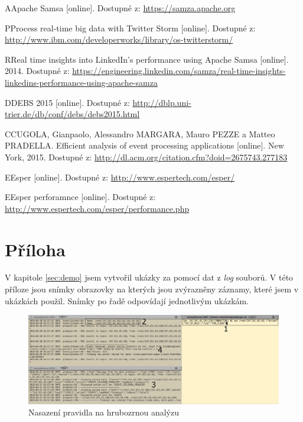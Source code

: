 \documentclass[
  digital, %
  table,   %
  nolof,     %
  nolot,     %
  oneside, %
  nocover,
  monochrome,
  12pt
]{fithesis3}
\begin{document}
\begin{thebibliography}{99}
\bibitem
AApache Samsa [online]. Dostupné z: \url{https://samza.apache.org} \label{bib_samsa}

\bibitem
PProcess real-time big data with Twitter Storm [online]. Dostupné z: \url{http://www.ibm.com/developerworks/library/os-twitterstorm/} \label{bib_distributed_computing}

\bibitem
RReal time insights into LinkedIn's performance using Apache Samsa [online]. 2014. Dostupné z: \url{https://engineering.linkedin.com/samza/real-time-insights-linkedins-performance-using-apache-samza} \label{bib_samsa_case_study}

\bibitem
DDEBS 2015 [online]. Dostupné z: \url{http://dblp.uni-trier.de/db/conf/debs/debs2015.html} \label{bib_debs_conf}

\bibitem
CCUGOLA, Gianpaolo, Alessandro MARGARA, Mauro PEZZE a Matteo PRADELLA. Efficient analysis of event processing applications [online]. New York, 2015. Dostupné z: \url{http://dl.acm.org/citation.cfm?doid=2675743.277183} \label{bib_cave}

\bibitem
EEsper [online]. Dostupné z: \url{http://www.espertech.com/esper/} \label{bib_esper}

\bibitem
EEsper perforamnce [online]. Dostupné z: \url{http://www.espertech.com/esper/performance.php} \label{bib_esper_power}

\end{thebibliography}
\appendix %

\chapter{Příloha}
\label{sec:appendix-a}
V kapitole \ref{sec:demo} jsem vytvořil ukázky za pomocí dat z \textit{log} souborů. V této příloze jsou snímky obrazovky na kterých jsou zvýrazněny záznamy, které jsem v ukázkách použil. Snímky po řadě odpovídají jednotlivým ukázkám.

\begin{figure}[H]
	\centering
    \includegraphics[width=\linewidth, height=.29\textheight]{images/deploy-rule-screen.png}
    \caption{Nasazení pravidla na hrubozrnou analýzu}
    \label{fig:deploy-rule-screen}
\end{figure}
\end{document}
